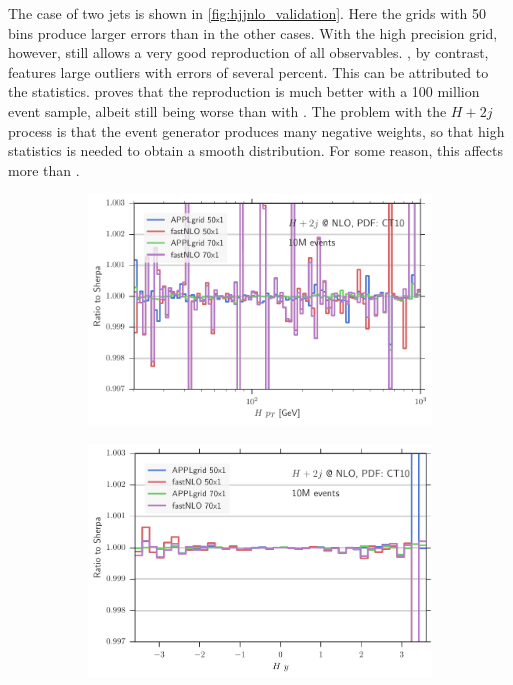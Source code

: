 The case of two jets is shown in \cref{fig:hjjnlo_validation}.
Here the grids with \num{50} bins produce larger errors than in the other cases.
With the high precision grid, however, \appl{} still allows a very good reproduction of all observables.
\fnlo{}, by contrast, features large outliers with errors of several percent.
This can be attributed to the statistics.
 proves that the reproduction is much better with a 100 million event sample, albeit still being worse than with \appl{}.
The problem with the $H + 2j$ process is that the event generator produces many negative weights, so that high statistics is needed to obtain a smooth distribution.
For some reason, this affects \fnlo{} more than \appl{}.
%
\begin{figure}
\centering
\begin{subfigure}[]{0.49\textwidth}
	\includegraphics[width=\textwidth]{images/hjjnlo_hpt_70v50.pdf}
\end{subfigure}
\hfill
\begin{subfigure}[]{0.49\textwidth}
	\includegraphics[width=\textwidth]{images/hjjnlo_hy_70v50.pdf}
\end{subfigure}


\end{figure}
